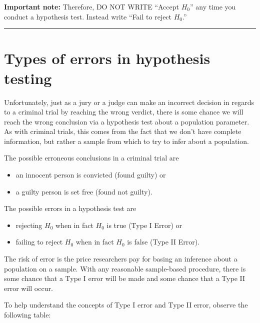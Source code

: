 \documentclass[12pt,]{krantz}
\providecommand{\tightlist}{%
  \setlength{\itemsep}{0pt}\setlength{\parskip}{0pt}}
\begin{document}
\textbf{Important note:} Therefore, DO NOT WRITE ``Accept \(H_0\)'' any
time you conduct a hypothesis test. Instead write ``Fail to reject
\(H_0\).''

\begin{center}\rule{0.5\linewidth}{\linethickness}\end{center}

\section{Types of errors in hypothesis
testing}\label{types-of-errors-in-hypothesis-testing}

Unfortunately, just as a jury or a judge can make an incorrect decision
in regards to a criminal trial by reaching the wrong verdict, there is
some chance we will reach the wrong conclusion via a hypothesis test
about a population parameter. As with criminal trials, this comes from
the fact that we don't have complete information, but rather a sample
from which to try to infer about a population.

The possible erroneous conclusions in a criminal trial are

\begin{itemize}
\tightlist
\item
  an innocent person is convicted (found guilty) or
\item
  a guilty person is set free (found not guilty).
\end{itemize}

The possible errors in a hypothesis test are

\begin{itemize}
\tightlist
\item
  rejecting \(H_0\) when in fact \(H_0\) is true (Type I Error) or
\item
  failing to reject \(H_0\) when in fact \(H_0\) is false (Type II
  Error).
\end{itemize}

The risk of error is the price researchers pay for basing an inference
about a population on a sample. With any reasonable sample-based
procedure, there is some chance that a Type I error will be made and
some chance that a Type II error will occur.

To help understand the concepts of Type I error and Type II error,
observe the following table:
\end{document}
